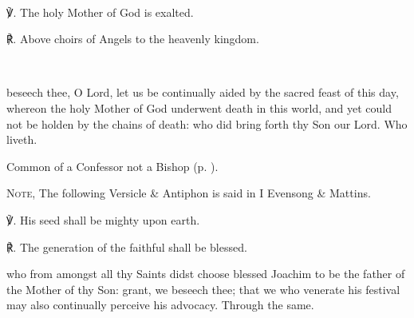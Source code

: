 \mattins
{}\\

℣. The holy Mother of God is exalted.

℟. Above choirs of Angels to the heavenly kingdom.


\secondEvensong
{}\\



\collect
{} beseech thee, O Lord, let us be continually aided by the sacred feast of this day, whereon the holy Mother of God underwent death in this world, and yet could not be holden by the chains of death: who did bring forth thy Son our Lord. Who liveth.



\begin{rubric}
	Common of a Confessor not a Bishop (p. \pageref{CommonConfessorNotBishop}).
\end{rubric}

\begin{rubric}
	\textsc{Note,} The following Versicle \& Antiphon is said in I Evensong \& Mattins.
\end{rubric}

℣. His seed shall be mighty upon earth.

℟. The generation of the faithful shall be blessed.


\vspace{-1\baselineskip}

\collect
{} who from amongst all thy Saints didst choose blessed Joachim to be the father of the Mother of thy Son: grant, we beseech thee; that we who venerate his festival may also continually perceive his advocacy. Through the same.


